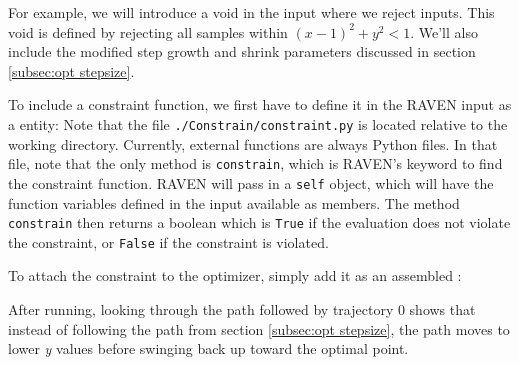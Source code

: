 For example, we will introduce a void in the input where we reject inputs.  This void is defined by rejecting
all samples within $(x-1)^2 + y^2 < 1$.  We'll also include the modified step growth and shrink parameters
discussed in section \ref{subsec:opt stepsize}.

To include a constraint function, we first have to define it in the RAVEN input as a 
entity:
Note that the file \texttt{./Constrain/constraint.py} is located relative to the working directory.  Currently,
external functions are always Python files.  In that file,
note that the only method is \texttt{constrain}, which is RAVEN's keyword to find the constraint function.
RAVEN will pass in a \texttt{self} object, which will have the function variables defined in the
 input available as members.  The method \texttt{constrain} then returns a boolean which is \texttt{True} if
the evaluation does not violate the constraint, or \texttt{False} if the constraint is violated.

To attach the constraint to the optimizer, simply add it as an assembled :

After running, looking through the path followed by trajectory 0 shows that instead of following the path from
section \ref{subsec:opt stepsize}, the path moves to lower \emph{y} values before swinging back up toward the
optimal point.

